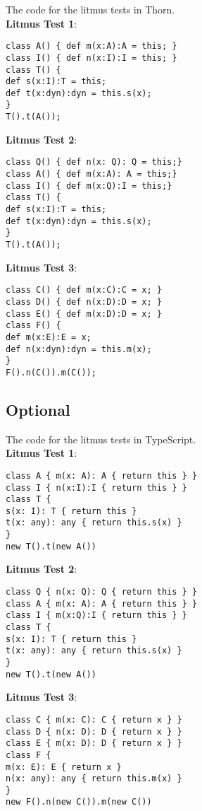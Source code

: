 \documentclass[]{article}
\begin{document}
The code for the litmus tests in Thorn. \\ 

\noindent
\textbf{Litmus Test 1}:
\begin{verbatim}
class A() { def m(x:A):A = this; }
class I() { def n(x:I):I = this; }
class T() {
def s(x:I):T = this;
def t(x:dyn):dyn = this.s(x);
}
T().t(A());
\end{verbatim}

\noindent
\textbf{Litmus Test 2}:
\begin{verbatim}
class Q() { def n(x: Q): Q = this;}
class A() { def m(x:A): A = this;}
class I() { def m(x:Q):I = this;}
class T() {
def s(x:I):T = this; 
def t(x:dyn):dyn = this.s(x);
}
T().t(A());   
\end{verbatim}


\noindent\textbf{Litmus Test 3}:
\begin{verbatim}
class C() { def m(x:C):C = x; }
class D() { def n(x:D):D = x; }
class E() { def m(x:D):D = x; }      
class F() {
def m(x:E):E = x;
def n(x:dyn):dyn = this.m(x);
} 
F().n(C()).m(C());
\end{verbatim}

\subsection*{Optional}

The code for the litmus tests in TypeScript. \\

\noindent\textbf{Litmus Test 1}:
\begin{verbatim}
class A { m(x: A): A { return this } }
class I { n(x:I):I { return this } }
class T {
s(x: I): T { return this }
t(x: any): any { return this.s(x) }
}
new T().t(new A())
\end{verbatim}

\noindent\textbf{Litmus Test 2}:
\begin{verbatim}
class Q { n(x: Q): Q { return this } }
class A { m(x: A): A { return this } }
class I { m(x:Q):I { return this } }
class T {
s(x: I): T { return this }
t(x: any): any { return this.s(x) }
}
new T().t(new A())
\end{verbatim}

\noindent\textbf{Litmus Test 3}:
\begin{verbatim}
class C { m(x: C): C { return x } }
class D { n(x: D): D { return x } }
class E { m(x: D): D { return x } }
class F {
m(x: E): E { return x }
n(x: any): any { return this.m(x) }
}
new F().n(new C()).m(new C())
\end{verbatim}
\end{document}
